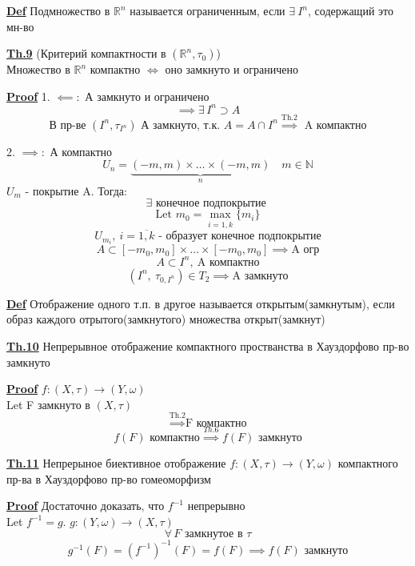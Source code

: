 \documentclass[a4paper]{article}
\begin{document}
\begin{tcolorbox}
\textbf{\underline{Def}} Подмножество в $ \mathbb{R}^{n} $ называется ограниченным, если
$ \exists \ I^{n} $, содержащий это мн-во
\end{tcolorbox}

\begin{tcolorbox}
\textbf{\underline{Th.9}} (Критерий компактности в $ (\mathbb{R}^{n}, \tau_0) $)\\
Множество в $ \mathbb{R}^{n} $ компактно $ \iff $ оно замкнуто и ограничено

\textbf{\underline{Proof}} 1. $ \impliedby: $ А замкнуто и ограничено
\[
    \implies \exists \, I^{n} \supset A
\]
\[
    \text{В пр-ве } (I^{n}, \tau_{I^{n}}) \text{ А замкнуто, т.к. } A = A \cap I^{n}
    \stackrel{\text{Th.2}}{\implies} \text{ A компактно}
\]

2. $ \implies: $ А компактно
\[
    U_n = \underbrace{(-m, m) \times \dots \times (-m, m)}_{n} \quad m \in \mathbb{N}
\]
$ U_m $ - покрытие A. Тогда:
\[
    \exists \text{ конечное подпокрытие }
\]
\[
    \text{Let } m_0 = \max_{i = \overline{1,k}} \{ m_i \}
\]
\[
    U_{m_i}, \ i = \overline{1, k} \text{ - образует конечное подпокрытие}
\]
\[
    A \subset [-m_0, m_0] \times \dots \times [-m_0, m_0] \implies \text{A огр}
\]
\[
    A \subset I^{n}, \ \text{A компактно}
\]
\[
    (I^{n}, \ \tau_{0, I^{n}}) \in T_2 \implies \text{A замкнуто}
\]
\end{tcolorbox}

\begin{tcolorbox}
\textbf{\underline{Def}} Отображение одного т.п. в другое называется открытым(замкнутым),
если образ каждого отрытого(замкнутого) множества открыт(замкнут)
\end{tcolorbox}

\begin{tcolorbox}
\textbf{\underline{Th.10}} Непрерывное отображение компактного простванства в Хауздорфово
пр-во замкнуто

\textbf{\underline{Proof}} $ f: (X,\tau) \to (Y, \omega) $\\ 
Let F замкнуто в $ (X, \tau) $  
\[
    \stackrel{\text{Th.2}}{\implies} \text{F компактно}
\]
\[
    f(F) \text{ компактно} \stackrel{Th.6}{\implies} f(F) \text{ замкнуто}
\]
\end{tcolorbox}

\begin{tcolorbox}
\textbf{\underline{Th.11}} Непрерыное биективное отображение $ f: (X,\tau) \to (Y, \omega) $ 
компактного пр-ва в Хауздорфово пр-во гомеоморфизм

\textbf{\underline{Proof}} Достаточно доказать, что $ f^{-1} $ непрерывно\\
Let $ f^{-1} = g $. $ g: (Y, \omega) \to (X,\tau) $  
\[
    \forall \, F \text{ замкнутое в } \tau
\]
\[
    g^{-1}(F) = (f^{-1})^{-1}(F) = f(F) \implies f(F) \text{ замкнуто}
\]
\end{tcolorbox}
\end{document}
